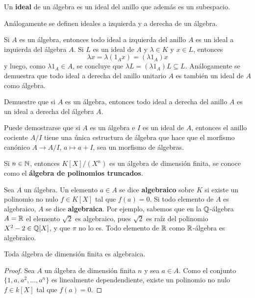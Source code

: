 \begin{definition}
	Un \textbf{ideal} de un álgebra es un ideal del anillo que además es un
	subespacio. 
\end{definition}

Análogamente se definen ideales a izquierda y a derecha de un álgebra.

	Si $A$ es un álgebra, entonces todo ideal a izquierda 
	del anillo $A$ es un ideal a izquierda del
	álgebra $A$. Si $L$ es un ideal de $A$ y $\lambda\in K$ y $x\in L$,
	entonces
	\[
		\lambda x=\lambda (1_Ax)=(\lambda 1_A)x
	\]
	y luego, como $\lambda 1_A\in A$, se concluye que $\lambda L=(\lambda
	1_A)L\subseteq L$. Análogamente se demuestra que todo ideal a derecha del
	anillo unitario $A$ es también un ideal de $A$ como álgebra. 

\begin{exercise}
	Demuestre que si $A$ es un álgebra, entonces todo ideal a derecha
	del anillo $A$ es un ideal a derecha del álgebra $A$.
\end{exercise}

Puede demostrarse que si 
$A$ es un álgebra e $I$ es un ideal de $A$, entonces el anillo cociente $A/I$ 
tiene una única estructura de álgebra que hace que el morfismo canónico 
$A\to A/I$, $a\mapsto a+I$, sea un morfismo de álgebras. 

\begin{example}
Si $n\in\mathbb{N}$, entonces $K[X]/(X^n)$ es un álgebra de dimensión finita, se conoce como el \textbf{álgebra de polinomios truncados}.  \end{example}

Sea $A$ un álgebra. Un elemento $a\in A$ se dice
\textbf{algebraico} sobre $K$ si existe un polinomio no nulo $f\in K[X]$
tal que $f(a)=0$. Si todo elemento de $A$ es algebraico, $A$ se dice
\textbf{algebraica}. Por ejemplo, sabemos que en la $\mathbb{Q}$-álgebra $A=\mathbb{R}$ el elemento $\sqrt{2}$ es algebraico, pues $\sqrt{2}$ es raíz del polinomio $X^2-2\in\mathbb{Q}[X]$,  
y que $\pi$ no lo es. Todo elemento de $\mathbb{R}$ como $\mathbb{R}$-álgebra es algebraico.

\begin{proposition}
	\label{lem:algebraica}
	Toda álgebra de dimensión finita es algebraica. 
\end{proposition}

\begin{proof}
   Sea $A$ un álgebra de dimensión finita $n$    
	y sea $a\in A$. Como el conjunto 
	$\{1,a,a^2,\dots,a^n\}$ es linealmente dependendiente, existe un polinomio
	no nulo $f\in k[X]$ tal que $f(a)=0$.
\end{proof}

